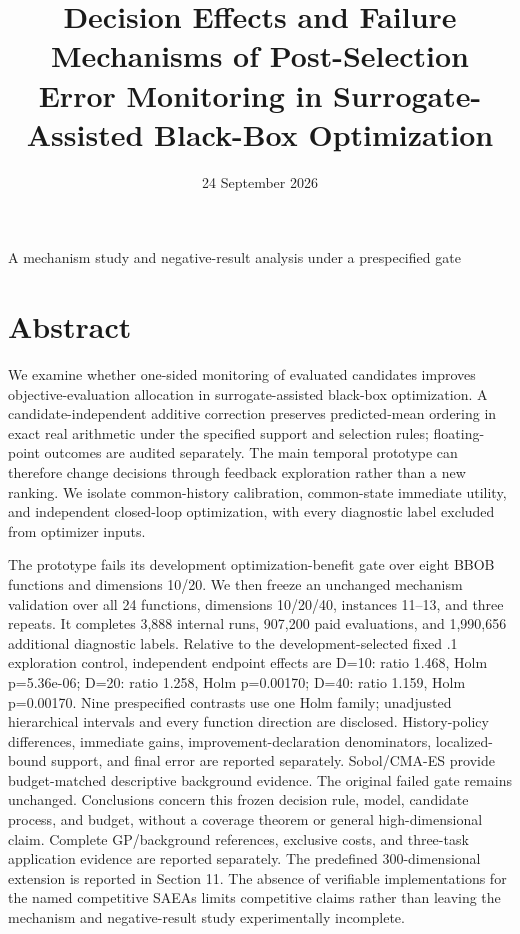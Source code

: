 \documentclass[11pt,a4paper]{article}
\title{Decision Effects and Failure Mechanisms of Post-Selection Error
Monitoring in Surrogate-Assisted Black-Box Optimization}
\author{}
\date{24 September 2026}
\begin{document}
\maketitle
\begin{center}A mechanism study and negative-result analysis under a
prespecified gate\end{center}
\hypertarget{abstract}{%
\section{Abstract}\label{abstract}}

We examine whether one-sided monitoring of evaluated candidates improves
objective-evaluation allocation in surrogate-assisted black-box
optimization. A candidate-independent additive correction preserves
predicted-mean ordering in exact real arithmetic under the specified
support and selection rules; floating-point outcomes are audited
separately. The main temporal prototype can therefore change decisions
through feedback exploration rather than a new ranking. We isolate
common-history calibration, common-state immediate utility, and
independent closed-loop optimization, with every diagnostic label
excluded from optimizer inputs.

The prototype fails its development optimization-benefit gate over eight
BBOB functions and dimensions 10/20. We then freeze an unchanged
mechanism validation over all 24 functions, dimensions 10/20/40,
instances 11--13, and three repeats. It completes 3,888 internal runs,
907,200 paid evaluations, and 1,990,656 additional diagnostic labels.
Relative to the development-selected fixed .1 exploration control,
independent endpoint effects are D=10: ratio 1.468, Holm p=5.36e-06;
D=20: ratio 1.258, Holm p=0.00170; D=40: ratio 1.159, Holm p=0.00170.
Nine prespecified contrasts use one Holm family; unadjusted hierarchical
intervals and every function direction are disclosed. History-policy
differences, immediate gains, improvement-declaration denominators,
localized-bound support, and final error are reported separately.
Sobol/CMA-ES provide budget-matched descriptive background evidence. The
original failed gate remains unchanged. Conclusions concern this frozen
decision rule, model, candidate process, and budget, without a coverage
theorem or general high-dimensional claim. Complete GP/background
references, exclusive costs, and three-task application evidence are
reported separately. The predefined 300-dimensional extension is
reported in Section 11. The absence of verifiable implementations for
the named competitive SAEAs limits competitive claims rather than
leaving the mechanism and negative-result study experimentally
incomplete.
\end{document}

